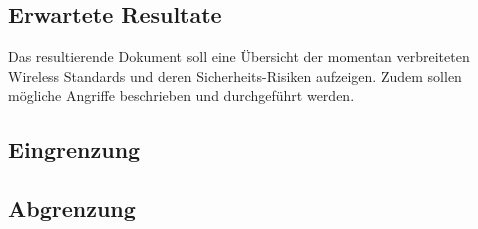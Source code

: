 \subsection{Erwartete Resultate}
Das resultierende Dokument soll eine Übersicht der momentan verbreiteten Wireless Standards und deren Sicherheits-Risiken aufzeigen.
Zudem sollen mögliche Angriffe beschrieben und durchgeführt werden.


\subsection{Eingrenzung}

\subsection{Abgrenzung}

